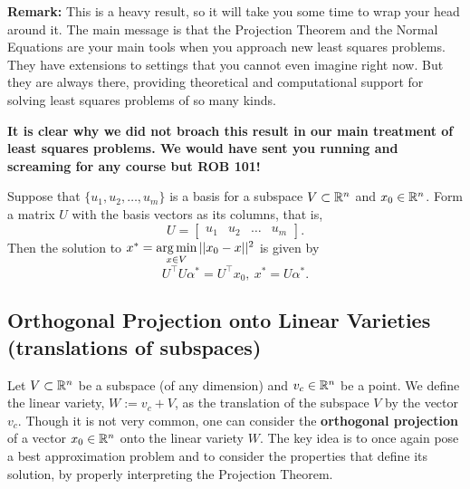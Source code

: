 \textbf{Remark:} This is a heavy result, so it will take you some time to wrap your head around it. The main message is that the Projection Theorem and the Normal Equations are your main tools when you approach new least squares problems. They have extensions to settings that you cannot even imagine right now. But they are always there, providing theoretical and computational support for solving least squares problems of so many kinds.

\vspace*{.2cm}

\textbf{It is clear why we did not broach this result in our main treatment of least squares problems. We would have sent you running and screaming for any course but ROB 101!}

\vspace*{0.2cm}

\begin{tcolorbox}[title=\textbf{Summary of the Previous Example}]
Suppose that $\{u_1, u_2, \ldots, u_m \}$ is a basis for a subspace $V \subset \mathbb R^n$ and $x_0 \in \mathbb R^n$. Form a matrix $U$ with the  basis vectors as its columns, that is,
$$U= \left[ \begin{array}{cccc}u_1 & u_2 & \ldots & u_m \end{array}\right]. $$
Then the solution to 
 $x^\ast = \operatorname*{arg\,min}\limits_{x \in V} || x_0 - x||^2 $ is given by
 $$\boxed{U^\top U \alpha^\ast = U^\top x_0,~ x^\ast = U \alpha^\ast.} $$
\end{tcolorbox}

\subsection{Orthogonal Projection onto Linear Varieties (translations of subspaces)}
Let $V\subset \mathbb R^n$ be a subspace (of any dimension) and $v_c \in \mathbb R^n$ be a point. We define the linear variety, $W:=v_c + V$, as the translation of the subspace $V$ by the vector $v_c$. Though it is not very common, one can consider the \textbf{orthogonal projection} of a vector $x_0\in \mathbb R^n$ onto the linear variety $W$. The key idea is to once again pose a best approximation problem and to consider the properties that define its solution, by properly interpreting the Projection Theorem. 

